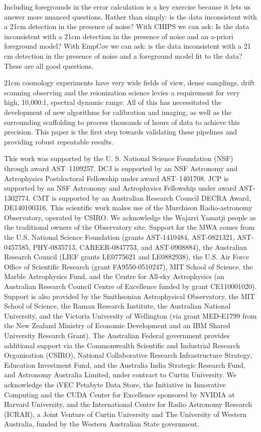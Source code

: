 \documentclass[twolcolumn,iop]{emulateapj}
\def\empirical{EmpCov}
\begin{document}
Including foregrounds in the error calculation is a key exercise because it lets us answer more nuanced questions. Rather than simply: is the data inconsistent with a 21cm detection in the presence of noise? With CHIPS we can ask: Is the data inconsistent with a 21cm detection in the presence of noise and an a-priori foreground model? With \empirical{} we can ask: is the data inconsistent with a 21 cm detection in the presence of noise and a foreground model fit to the data? These are all good questions.

21cm cosmology experiments have very wide fields of view, dense samplings, drift scanning observing and the reionization science levies a requirement for very high, 10,000:1, spectral dynamic range. All of this has necessitated the development of new algorithms for calibration and imaging, as well as the surrounding scaffolding to process thousands of hours of data to achieve this precision.  This paper is the first step towards validating these pipelines and providing robust repeatable results.





\acknowledgments

This work was supported	 by the U. S. National Science Foundation (NSF) through award AST--1109257. DCJ is supported by an NSF Astronomy and Astrophysics Postdoctoral Fellowship under award AST--1401708. JCP is supported by an NSF Astronomy and Astrophysics Fellowship under award AST-1302774. CMT is supported by an Australian Research Council DECRA Award, DE140100316. This scientific work makes use of the Murchison Radio-astronomy Observatory, operated by CSIRO. We acknowledge the Wajarri Yamatji people as the traditional owners of the Observatory site. Support for the MWA comes from the U.S. National Science Foundation (grants  AST-1410484, AST-0821321, AST-0457585, PHY-0835713, CAREER-0847753, and AST-0908884), the Australian Research Council (LIEF grants LE0775621 and LE0882938), the U.S. Air Force Office of Scientific Research (grant FA9550-0510247), MIT School of Science, the Marble Astrophysics Fund, and the Centre for All-sky Astrophysics (an Australian Research Council Centre of Excellence funded by grant CE110001020). Support is also provided by the Smithsonian Astrophysical Observatory, the MIT School of Science, the Raman Research Institute, the Australian National University, and the Victoria University of Wellington (via grant MED-E1799 from the New Zealand Ministry of Economic Development and an IBM Shared University Research Grant). The Australian Federal government provides additional support via the Commonwealth Scientific and Industrial Research Organisation (CSIRO), National Collaborative Research Infrastructure Strategy, Education Investment Fund, and the Australia India Strategic Research Fund, and Astronomy Australia Limited, under contract to Curtin University. We acknowledge the iVEC Petabyte Data Store, the Initiative in Innovative Computing and the CUDA Center for Excellence sponsored by NVIDIA at Harvard University, and the International Centre for Radio Astronomy Research (ICRAR), a Joint Venture of Curtin University and The University of Western Australia, funded by the Western Australian State government.


\end{document}

